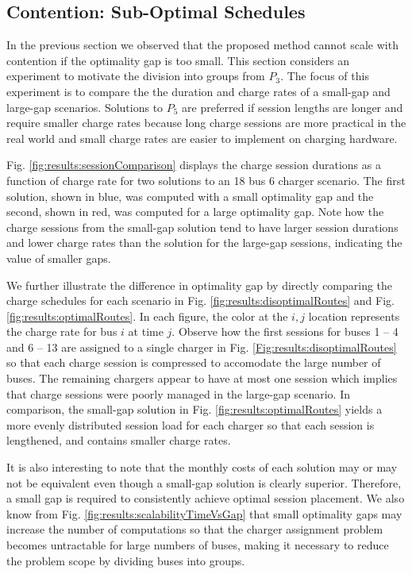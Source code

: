 \subsection{Contention: Sub-Optimal Schedules}
In the previous section we observed that the proposed method cannot scale with contention if the optimality gap is too small. This section considers an experiment to motivate the division into groups from $P_3$. The focus of this experiment is to compare the the duration and charge rates of a small-gap and large-gap scenarios. Solutions to $P_5$ are preferred if session lengths are longer and require smaller charge rates because long charge sessions are more practical in the real world and small charge rates are easier to implement on charging hardware.

\par Fig. \ref{fig:results:sessionComparison} displays the charge session durations as a function of charge rate for two solutions to an 18 bus 6 charger scenario. The first solution, shown in blue, was computed with a small optimality gap and the second, shown in red, was computed for a large optimality gap. Note how the charge sessions from the small-gap solution tend to have larger session durations and lower charge rates than the solution for the large-gap sessions, indicating the value of smaller gaps.

\par We further illustrate the difference in optimality gap by directly comparing the charge schedules for each scenario in Fig. \ref{fig:results:disoptimalRoutes} and Fig. \ref{fig:results:optimalRoutes}. In each figure, the color at the $i,j$ location represents the charge rate for bus $i$ at time $j$. Observe how the first sessions for buses 1 -- 4 and 6 -- 13 are assigned to a single charger in Fig. \ref{Fig:results:disoptimalRoutes} so that each charge session is compressed to accomodate the large number of buses. The remaining chargers appear to have at most one session which implies that charge sessions were poorly managed in the large-gap scenario. In comparison, the small-gap solution in Fig. \ref{fig:results:optimalRoutes} yields a more evenly distributed session load for each charger so that each session is lengthened, and contains smaller charge rates.

\par It is also interesting to note that the monthly costs of each solution may or may not be equivalent even though a small-gap solution is clearly superior. Therefore, a small gap is required to consistently achieve optimal session placement. We also know from Fig. \ref{fig:results:scalabilityTimeVsGap} that small optimality gaps may increase the number of computations so that the charger assignment problem becomes untractable for large numbers of buses, making it necessary to reduce the problem scope by dividing buses into groups. 



